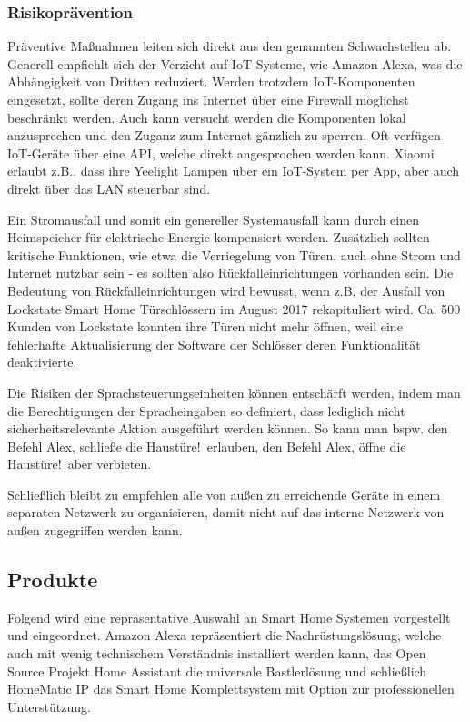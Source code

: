 \subsubsection{Risikoprävention}

Präventive Maßnahmen leiten sich direkt aus den genannten Schwachstellen ab.
Generell empfiehlt sich der Verzicht auf \ac{IoT}-Systeme, wie Amazon Alexa, was die Abhängigkeit von Dritten reduziert.
Werden trotzdem \ac{IoT}-Komponenten eingesetzt, sollte deren Zugang ins Internet über eine Firewall möglichst beschränkt werden.
Auch kann versucht werden die Komponenten lokal anzusprechen und den Zuganz zum Internet gänzlich zu sperren.
Oft verfügen \ac{IoT}-Geräte über eine \ac{API}, welche direkt angesprochen werden kann.
Xiaomi erlaubt z.B., dass ihre Yeelight Lampen über ein \ac{IoT}-System per App, aber auch direkt über das \ac{LAN} steuerbar sind.

Ein Stromausfall und somit ein genereller Systemausfall kann durch einen Heimspeicher für elektrische Energie kompensiert werden.
Zusätzlich sollten kritische Funktionen, wie etwa die Verriegelung von Türen, auch ohne Strom und Internet nutzbar sein - es sollten also Rückfalleinrichtungen vorhanden sein.
Die Bedeutung von Rückfalleinrichtungen wird bewusst, wenn z.B. der Ausfall von Lockstate Smart Home Türschlössern im August 2017 rekapituliert wird.
Ca. 500 Kunden von Lockstate konnten ihre Türen nicht mehr öffnen, weil eine fehlerhafte Aktualisierung der Software der Schlösser deren Funktionalität deaktivierte.

Die Risiken der Sprachsteuerungseinheiten können entschärft werden, indem man die Berechtigungen der Spracheingaben so definiert, dass lediglich nicht sicherheitsrelevante Aktion ausgeführt werden können.
So kann man bspw. den Befehl \glqq Alex, schließe die Haustüre!\grqq \ erlauben, den Befehl \glqq Alex, öffne die Haustüre!\grqq \ aber verbieten.

Schließlich bleibt zu empfehlen alle von außen zu erreichende Geräte in einem separaten Netzwerk zu organisieren, damit nicht auf das interne Netzwerk von außen zugegriffen werden kann.

\subsection{Produkte}

Folgend wird eine repräsentative Auswahl an Smart Home Systemen vorgestellt und eingeordnet.
Amazon Alexa repräsentiert die Nachrüstungslösung, welche auch mit wenig technischem Verständnis installiert werden kann, das Open Source Projekt Home Assistant die universale Bastlerlösung und schließlich HomeMatic IP das Smart Home Komplettsystem mit Option zur professionellen Unterstützung.

